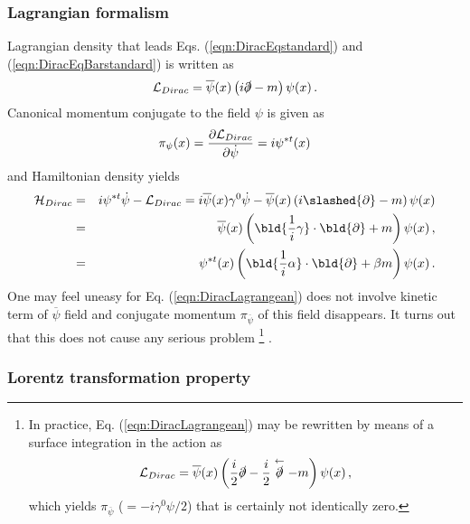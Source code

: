 \subsubsection{Lagrangian formalism}

Lagrangian density that leads Eqs. (\ref{eqn:DiracEqstandard}) and (\ref{eqn:DiracEqBarstandard})
is written as
\begin{eqnarray}
{\cal L}_{Dirac}
=
\overline{\psi}(x)
\left(i \slashed{\partial} - m \right)
\psi(x) \,.
\label{eqn:DiracLagrangean}
\end{eqnarray}
Canonical momentum conjugate to the field $\psi$ is given as
\begin{eqnarray}
\pi_{\psi}(x) = \frac{\partial {\cal L}_{Dirac}}{\partial \dot{\psi}}
=
i \psi^{*t} (x) 
\end{eqnarray}
and Hamiltonian density yields
\begin{eqnarray}
{\cal H}_{Dirac}
&=&
i \psi^{*t}  \dot {\psi} - {\cal L}_{Dirac}
= 
i \overline{\psi}(x) \gamma^0 \dot {\psi}
- 
\overline{\psi}(x)
\left(i \slashed{\partial} - m \right)
\psi(x)
\nonumber\\
&=&
\overline{\psi}(x)
\left(
 \bld{ \frac{1}{i}\gamma}\cdot\bld{\partial} + m 
 \right)
 \psi(x)\,,
 \\
 &=&
\psi^{*t}(x)
\left(
 \bld{ \frac{1}{i}\alpha}\cdot\bld{\partial} + \beta m 
 \right)
 \psi(x)\,.
\end{eqnarray}
One may feel uneasy for Eq. (\ref{eqn:DiracLagrangean})
does not involve kinetic term of $\overline{\psi}$ field and
conjugate momentum $\pi_{\overline{\psi}}$ of this field disappears. It turns out
that this does not cause any serious problem
\footnote{%
In practice,
Eq. (\ref{eqn:DiracLagrangean}) may be rewritten by means
of a surface integration in the action as \cite{ref:Itzykson-Zuber}
\begin{eqnarray*}
{\cal L}_{Dirac}
=
\overline{\psi}(x)
\left(
\frac{i}{2} \slashed{\partial}
- \frac{i}{2}  \stackrel{\leftarrow}{\slashed{\partial}}
 - m \right)
\psi(x) \,,
\label{eqn:DiracLagrangeanIZ}
\end{eqnarray*}
which yields $\pi_{\overline{\psi}}$ ($= -i \gamma^0 \psi / 2$)
that is certainly not identically zero.
}%
.
\bigskip
\subsubsection{Lorentz transformation property}

